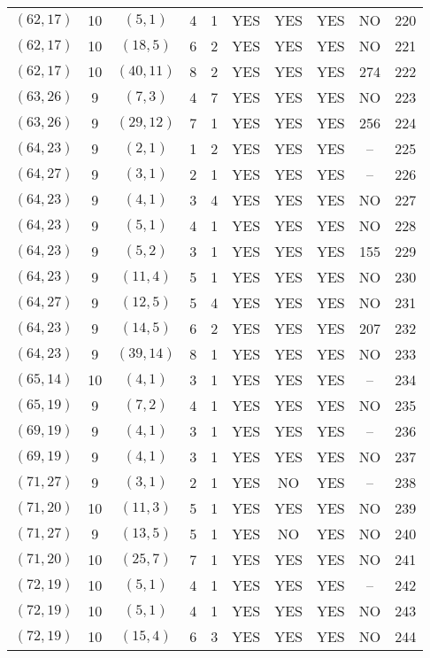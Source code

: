 \begin{longtable}{|c|c|c|c|c|c|c|c|c|c|}
$(62, 17)$ & 10 & $(5, 1)$ & 4 & 1 & YES & YES & YES & NO & 220\\
$(62, 17)$ & 10 & $(18, 5)$ & 6 & 2 & YES & YES & YES & NO & 221\\
$(62, 17)$ & 10 & $(40, 11)$ & 8 & 2 & YES & YES & YES & 274 & 222\\
$(63, 26)$ & 9 & $(7, 3)$ & 4 & 7 & YES & YES & YES & NO & 223\\
$(63, 26)$ & 9 & $(29, 12)$ & 7 & 1 & YES & YES & YES & 256 & 224\\
$(64, 23)$ & 9 & $(2, 1)$ & 1 & 2 & YES & YES & YES & -- & 225\\
$(64, 27)$ & 9 & $(3, 1)$ & 2 & 1 & YES & YES & YES & -- & 226\\
$(64, 23)$ & 9 & $(4, 1)$ & 3 & 4 & YES & YES & YES & NO & 227\\
$(64, 23)$ & 9 & $(5, 1)$ & 4 & 1 & YES & YES & YES & NO & 228\\
$(64, 23)$ & 9 & $(5, 2)$ & 3 & 1 & YES & YES & YES & 155 & 229\\
$(64, 23)$ & 9 & $(11, 4)$ & 5 & 1 & YES & YES & YES & NO & 230\\
$(64, 27)$ & 9 & $(12, 5)$ & 5 & 4 & YES & YES & YES & NO & 231\\
$(64, 23)$ & 9 & $(14, 5)$ & 6 & 2 & YES & YES & YES & 207 & 232\\
$(64, 23)$ & 9 & $(39, 14)$ & 8 & 1 & YES & YES & YES & NO & 233\\
$(65, 14)$ & 10 & $(4, 1)$ & 3 & 1 & YES & YES & YES & -- & 234\\
$(65, 19)$ & 9 & $(7, 2)$ & 4 & 1 & YES & YES & YES & NO & 235\\
$(69, 19)$ & 9 & $(4, 1)$ & 3 & 1 & YES & YES & YES & -- & 236\\
$(69, 19)$ & 9 & $(4, 1)$ & 3 & 1 & YES & YES & YES & NO & 237\\
$(71, 27)$ & 9 & $(3, 1)$ & 2 & 1 & YES & NO & YES & -- & 238\\
$(71, 20)$ & 10 & $(11, 3)$ & 5 & 1 & YES & YES & YES & NO & 239\\
$(71, 27)$ & 9 & $(13, 5)$ & 5 & 1 & YES & NO & YES & NO & 240\\
$(71, 20)$ & 10 & $(25, 7)$ & 7 & 1 & YES & YES & YES & NO & 241\\
$(72, 19)$ & 10 & $(5, 1)$ & 4 & 1 & YES & YES & YES & -- & 242\\
$(72, 19)$ & 10 & $(5, 1)$ & 4 & 1 & YES & YES & YES & NO & 243\\
$(72, 19)$ & 10 & $(15, 4)$ & 6 & 3 & YES & YES & YES & NO & 244\\

\end{longtable}
